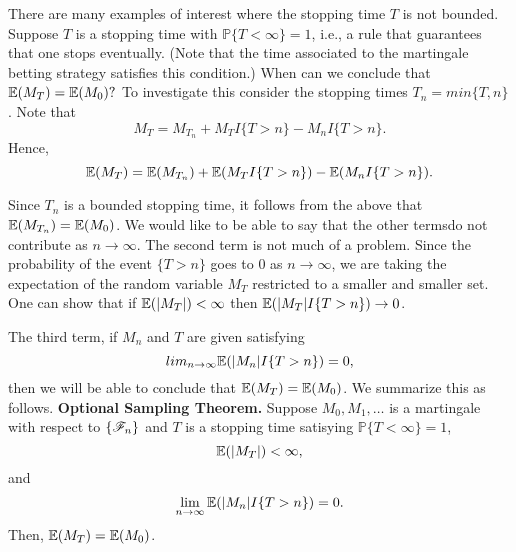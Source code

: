 \documentclass[a4paper,english,10pt]{article}
\begin{document}
There are many examples of interest where the stopping time $T$ is not bounded. Suppose $T$ is a stopping time with $\mathbb{P}\{T<\infty\}=1$, i.e., a rule that guarantees that one stops eventually. (Note that the time associated to the martingale betting strategy satisfies this condition.) When can we conclude that $\mathbb{E}(M_T)=\mathbb{E}(M_0)?$ To investigate this consider the stopping times $T_n=min\{T,n\}$. Note that
\begin{equation*}
M_T=M_{T_{n}}+M_TI\{T>n\}-M_nI\{T>n\}.
\end{equation*}
Hence,
\begin{equation*}
\mathbb{E}(M_T)=\mathbb{E}(M_{T_{n}})+\mathbb{E}(M_TI\{T>n\})-\mathbb{E}(M_nI\{T>n\}).
\end{equation*}

Since $T_n$ is a bounded stopping time, it follows from the above that $\mathbb{E}(M_{T_{n}})=\mathbb{E}(M_0)$. We would like to be able to say that the other termsdo not contribute as $n\to \infty$. The second term is not much of a problem.  Since the probability of the event $\{T>n\}$ goes to 0 as $n\to \infty$, we are taking the expectation of the random variable $M_T$ restricted to a smaller and smaller set. One can show that if $\mathbb{E}(|M_T|)<\infty$ then $\mathbb{E}(|M_T|I\{T>n\}) \to 0$.

The third term, if $M_n$ and $T$ are given satisfying
\begin{equation*}
lim_{n\to \infty}\mathbb{E}(|M_n|I\{T>n\})=0,
\end{equation*}
then we will be able to conclude that $\mathbb{E}(M_T)=\mathbb{E}(M_0)$. We summarize this as follows.\newline
\textbf{Optional Sampling Theorem.} Suppose $M_0,M_1,\dots$ is a martingale with respect to $\{\mathscr{F}_n\}$ and $T$ is a stopping time satisying $\mathbb{P}\{T<\infty\}=1$,
\begin{equation*}
\mathbb{E}(|M_T|)<\infty,
\end{equation*}
and
\begin{equation*}
\lim_{n\to \infty}\mathbb{E}(|M_n|I\{T>n\})=0.
\end{equation*}
Then, $\mathbb{E}(M_T)=\mathbb{E}(M_0)$.
\end{document}
